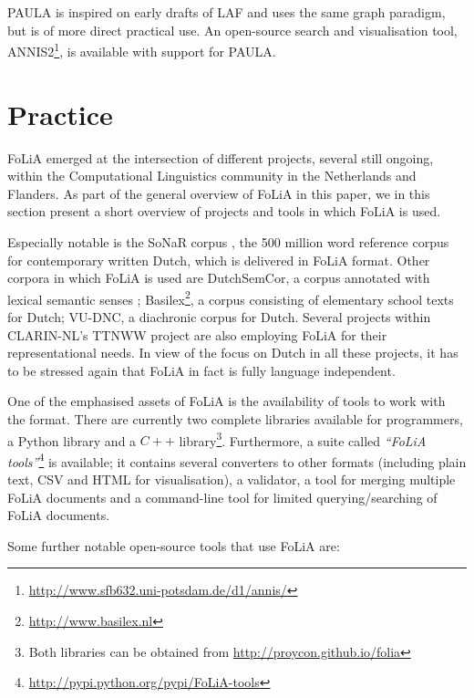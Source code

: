 \documentclass[a4paper,10pt,twoside]{article}
\begin{document}
PAULA is inspired on early drafts of LAF and uses the same graph paradigm, but
is of more direct practical use. An open-source search and visualisation tool,
ANNIS2\footnote{\url{http://www.sfb632.uni-potsdam.de/d1/annis/}}, is available
with support for PAULA.


\section{Practice}
\label{sec:practice}

FoLiA emerged at the intersection of different projects, several still ongoing, within the Computational
Linguistics community in the Netherlands and Flanders. As part of the general overview of FoLiA in this paper, we in
this section present a short overview of projects and tools in which FoLiA is
used.
 
Especially notable is the SoNaR corpus \cite{StevinSONAR2013}, the 500 million
word reference corpus for contemporary written Dutch, which is delivered in
FoLiA format. Other corpora in which FoLiA is used are DutchSemCor, a corpus
annotated with lexical semantic senses \cite{DUTCHSEMCOR};
Basilex\footnote{\url{http://www.basilex.nl}}, a corpus consisting of
elementary school texts for Dutch; VU-DNC, a diachronic corpus for Dutch.
Several projects within CLARIN-NL's TTNWW project are also employing FoLiA for
their representational needs. In view of the focus on Dutch in all these
projects, it has to be stressed again that FoLiA in fact is fully language
independent.

One of the emphasised assets of FoLiA is the availability of tools to work with the
format. There are currently two complete libraries available for programmers, a Python
library and a $C++$ library\footnote{Both libraries can be obtained from
\url{http://proycon.github.io/folia}}. Furthermore, a suite called \emph{``FoLiA
tools''}\footnote{\url{http://pypi.python.org/pypi/FoLiA-tools}} is
available; it contains several converters to other formats (including plain
text, CSV and HTML for visualisation), a validator, a tool for merging
multiple FoLiA documents and a command-line tool for limited querying/searching of FoLiA documents.

Some further notable open-source tools that use FoLiA are:
\end{document}
